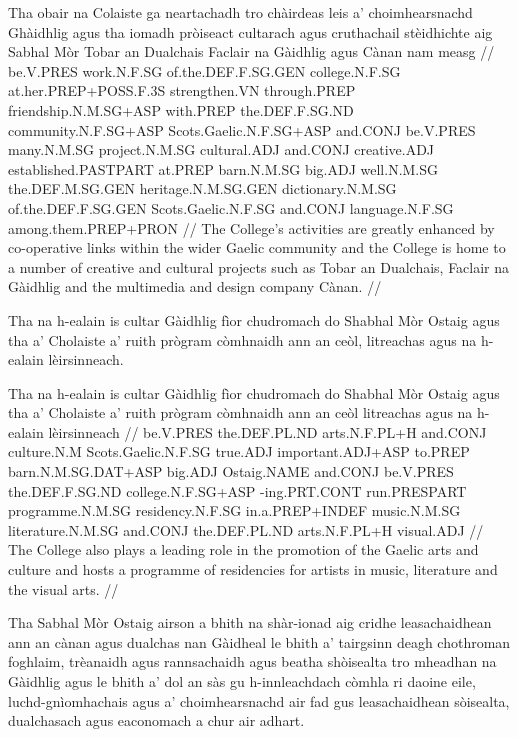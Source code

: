 \documentclass[a4paper,10pt]{article}
\begin{document}
\vspace{4mm}
\gla Tha obair na Colaiste ga neartachadh tro chàirdeas leis a' choimhearsnachd Ghàidhlig agus tha iomadh pròiseact cultarach agus cruthachail stèidhichte aig Sabhal Mòr Tobar an Dualchais Faclair na Gàidhlig agus Cànan {nam measg}  //
\glb be.V.PRES work.N.F.SG of.the.DEF.F.SG.GEN college.N.F.SG at.her.PREP+POSS.F.3S strengthen.VN through.PREP friendship.N.M.SG+ASP with.PREP the.DEF.F.SG.ND community.N.F.SG+ASP Scots.Gaelic.N.F.SG+ASP and.CONJ be.V.PRES many.N.M.SG project.N.M.SG cultural.ADJ and.CONJ creative.ADJ established.PASTPART at.PREP barn.N.M.SG big.ADJ well.N.M.SG the.DEF.M.SG.GEN heritage.N.M.SG.GEN dictionary.N.M.SG of.the.DEF.F.SG.GEN Scots.Gaelic.N.F.SG and.CONJ language.N.F.SG among.them.PREP+PRON  //
\glft The College's activities are greatly enhanced by co-operative links within the wider Gaelic community and the College is home to a number of creative and cultural projects such as Tobar an Dualchais, Faclair na Gàidhlig and the multimedia and design company Cànan. //
\endgl
\xe

\ex
\begingl
\glpre Tha na h-ealain is cultar Gàidhlig fìor chudromach do Shabhal Mòr Ostaig agus tha a' Cholaiste a' ruith prògram còmhnaidh ann an ceòl, litreachas agus na h-ealain lèirsinneach. 

\vspace{4mm}
\gla Tha na h-ealain is cultar Gàidhlig fìor chudromach do Shabhal Mòr Ostaig agus tha a' Cholaiste a' ruith prògram còmhnaidh {ann an} ceòl litreachas agus na h-ealain lèirsinneach  //
\glb be.V.PRES the.DEF.PL.ND arts.N.F.PL+H and.CONJ culture.N.M Scots.Gaelic.N.F.SG true.ADJ important.ADJ+ASP to.PREP barn.N.M.SG.DAT+ASP big.ADJ Ostaig.NAME and.CONJ be.V.PRES the.DEF.F.SG.ND college.N.F.SG+ASP -ing.PRT.CONT run.PRESPART programme.N.M.SG residency.N.F.SG in.a.PREP+INDEF music.N.M.SG literature.N.M.SG and.CONJ the.DEF.PL.ND arts.N.F.PL+H visual.ADJ  //
\glft The College also plays a leading role in the promotion of the Gaelic arts and culture and hosts a programme of residencies for artists in music, literature and the visual arts. //
\endgl
\xe

\ex
\begingl
\glpre Tha Sabhal Mòr Ostaig airson a bhith na shàr-ionad aig cridhe leasachaidhean ann an cànan agus dualchas nan Gàidheal le bhith a' tairgsinn deagh chothroman foghlaim, trèanaidh agus rannsachaidh agus beatha shòisealta tro mheadhan na Gàidhlig agus le bhith a' dol an sàs gu h-innleachdach còmhla ri daoine eile, luchd-gnìomhachais agus a' choimhearsnachd air fad gus leasachaidhean sòisealta, dualchasach agus eaconomach a chur air adhart. 
\end{document}
